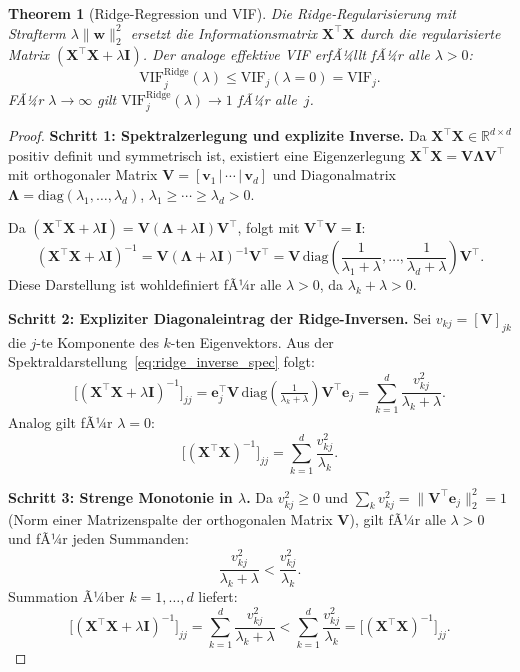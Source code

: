 ﻿\documentclass[12pt, a4paper]{article}
\newtheorem{theorem}{Theorem}[section]
\theoremstyle{definition}
\theoremstyle{remark}
\newcommand{\R}{\mathbb{R}}
\newcommand{\vw}{\bm{w}}
\newcommand{\vX}{\bm{X}}
\newcommand{\T}{\top}
\newcommand{\diag}{\mathrm{diag}}
\begin{document}
\begin{theorem}[Ridge-Regression und VIF]
	\label{thm:ridge_vif}
	Die Ridge-Regularisierung mit Strafterm $\lambda\|\vw\|_2^2$ ersetzt die Informationsmatrix
	$\vX^\T\vX$ durch die regularisierte Matrix $(\vX^\T\vX + \lambda\bm{I})$. Der analoge
	effektive VIF erfÃ¼llt fÃ¼r alle $\lambda > 0$:
	\begin{equation}
		\mathrm{VIF}_j^{\mathrm{Ridge}}(\lambda) \leq \mathrm{VIF}_j(\lambda=0) = \mathrm{VIF}_j.
		\label{eq:vif_ridge}
	\end{equation}
	FÃ¼r $\lambda \to \infty$ gilt $\mathrm{VIF}_j^{\mathrm{Ridge}}(\lambda) \to 1$ fÃ¼r alle~$j$.
\end{theorem}

\begin{proof}
	\textbf{Schritt 1: Spektralzerlegung und explizite Inverse.}
	Da $\vX^\T\vX \in \R^{d\times d}$ positiv definit und symmetrisch ist, existiert eine
	Eigenzerlegung $\vX^\T\vX = \bm{V}\bm{\Lambda}\bm{V}^\T$ mit orthogonaler Matrix
	$\bm{V} = [\bm{v}_1\,|\,\cdots\,|\,\bm{v}_d]$ und Diagonalmatrix
	$\bm{\Lambda} = \diag(\lambda_1, \ldots, \lambda_d)$, $\lambda_1 \geq \cdots \geq \lambda_d > 0$.
	
	Da $(\vX^\T\vX + \lambda\bm{I}) = \bm{V}(\bm{\Lambda}+\lambda\bm{I})\bm{V}^\T$, folgt mit
	$\bm{V}^\T\bm{V} = \bm{I}$:
	\begin{equation}
		(\vX^\T\vX + \lambda\bm{I})^{-1}
		= \bm{V}(\bm{\Lambda}+\lambda\bm{I})^{-1}\bm{V}^\T
		= \bm{V}\,\diag\!\left(\frac{1}{\lambda_1+\lambda}, \ldots, \frac{1}{\lambda_d+\lambda}\right)\bm{V}^\T.
		\label{eq:ridge_inverse_spec}
	\end{equation}
	Diese Darstellung ist wohldefiniert fÃ¼r alle $\lambda > 0$, da $\lambda_k + \lambda > 0$.
	
	\textbf{Schritt 2: Expliziter Diagonaleintrag der Ridge-Inversen.}
	Sei $v_{kj} = [\bm{V}]_{jk}$ die $j$-te Komponente des $k$-ten Eigenvektors. Aus der
	Spektraldarstellung~\eqref{eq:ridge_inverse_spec} folgt:
	\[
	\bigl[(\vX^\T\vX + \lambda\bm{I})^{-1}\bigr]_{jj}
	= \bm{e}_j^\T\bm{V}\,\diag\!\left(\tfrac{1}{\lambda_k+\lambda}\right)\bm{V}^\T\bm{e}_j
	= \sum_{k=1}^{d} \frac{v_{kj}^2}{\lambda_k + \lambda}.
	\]
	Analog gilt fÃ¼r $\lambda = 0$:
	\[
	\bigl[(\vX^\T\vX)^{-1}\bigr]_{jj} = \sum_{k=1}^{d} \frac{v_{kj}^2}{\lambda_k}.
	\]
	
	\textbf{Schritt 3: Strenge Monotonie in $\lambda$.}
	Da $v_{kj}^2 \geq 0$ und $\sum_k v_{kj}^2 = \|\bm{V}^\T\bm{e}_j\|_2^2 = 1$ (Norm einer
	Matrizenspalte der orthogonalen Matrix $\bm{V}$), gilt fÃ¼r alle $\lambda > 0$ und fÃ¼r jeden Summanden:
	\[
	\frac{v_{kj}^2}{\lambda_k + \lambda} < \frac{v_{kj}^2}{\lambda_k}.
	\]
	Summation Ã¼ber $k = 1, \ldots, d$ liefert:
	\[
	\bigl[(\vX^\T\vX + \lambda\bm{I})^{-1}\bigr]_{jj}
	= \sum_{k=1}^d \frac{v_{kj}^2}{\lambda_k+\lambda}
	< \sum_{k=1}^d \frac{v_{kj}^2}{\lambda_k}
	= \bigl[(\vX^\T\vX)^{-1}\bigr]_{jj}.
	\]
	

\end{proof}
\end{document}

